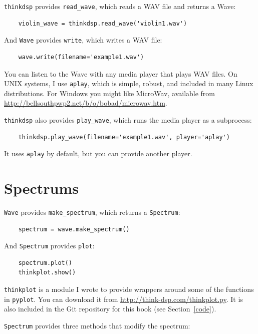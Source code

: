 \documentclass[12pt]{book}
\begin{document}
{\tt thinkdsp} provides \verb"read_wave", which reads a WAV
file and returns a Wave:

\begin{verbatim}
    violin_wave = thinkdsp.read_wave('violin1.wav')
\end{verbatim}

And {\tt Wave} provides {\tt write}, which writes a WAV file:

\begin{verbatim}
    wave.write(filename='example1.wav')
\end{verbatim}

You can listen to the Wave with any media player that plays WAV
files.  On UNIX systems, I use {\tt aplay}, which is simple, robust,
and included in many Linux distributions.  For Windows you might like
MicroWav, available from
\url{http://bellsouthpwp2.net/b/o/bobad/microwav.htm}.

{\tt thinkdsp} also provides \verb"play_wave", which runs
the media player as a subprocess:

\begin{verbatim}
    thinkdsp.play_wave(filename='example1.wav', player='aplay')
\end{verbatim}

It uses {\tt aplay} by default, but you can provide another player.


\section{Spectrums}

{\tt Wave} provides \verb"make_spectrum", which returns a
{\tt Spectrum}:

\begin{verbatim}
    spectrum = wave.make_spectrum()
\end{verbatim}

And {\tt Spectrum} provides {\tt plot}:

\begin{verbatim}
    spectrum.plot()
    thinkplot.show()
\end{verbatim}

{\tt thinkplot} is a module I wrote to provide wrappers around some of
the functions in {\tt pyplot}.  You can download it from
\url{http://think-dsp.com/thinkplot.py}.  It is also included in the
Git repository for this book (see Section~\ref{code}).

{\tt Spectrum} provides three methods that modify the spectrum:
\end{document}
